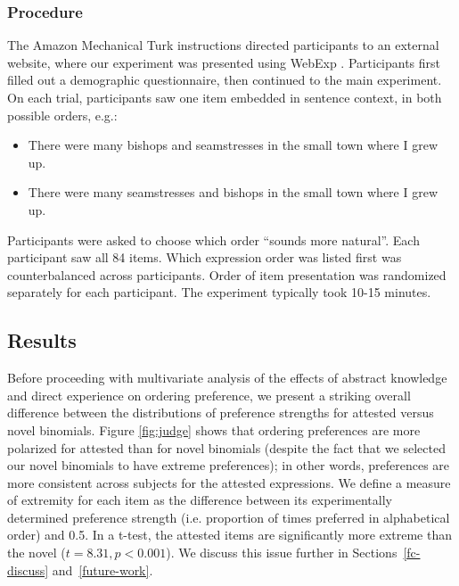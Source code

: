 \documentclass[authoryear]{elsarticle}
\begin{document}
\subsubsection{Procedure}
The Amazon Mechanical Turk instructions directed participants to an external website, where our experiment was presented using WebExp \citep{Keller:2009wn}. Participants first filled out a demographic questionnaire, then continued to the main experiment. On each trial, participants saw one item embedded in sentence context, in both possible orders, e.g.:
\begin{itemize}
\item There were many bishops and seamstresses in the small town where I grew up.
\item There were many seamstresses and bishops in the small town where I grew up.
\end{itemize}
Participants were asked to choose which order ``sounds more natural''. Each participant saw all 84 items. Which expression order was listed first was counterbalanced across participants. Order of item presentation was randomized separately for each participant. The experiment typically took 10-15 minutes.

\subsection{Results}
Before proceeding with multivariate analysis of the effects of abstract knowledge and direct experience on ordering preference, we present a striking overall difference between the distributions of preference strengths for attested versus novel binomials. Figure \ref{fig:judge} shows that ordering preferences are more polarized for attested than for novel binomials (despite the fact that we selected our novel binomials to have extreme preferences); in other words, preferences are more consistent across subjects for the attested expressions. We define a measure of extremity for each item as the difference between its experimentally determined preference strength (i.e. proportion of times preferred in alphabetical order) and 0.5. In a t-test, the attested items are significantly more extreme than the novel ($t=8.31, p < 0.001$). We discuss this issue further in Sections~\ref{fc-discuss} and~\ref{future-work}.
\end{document}
